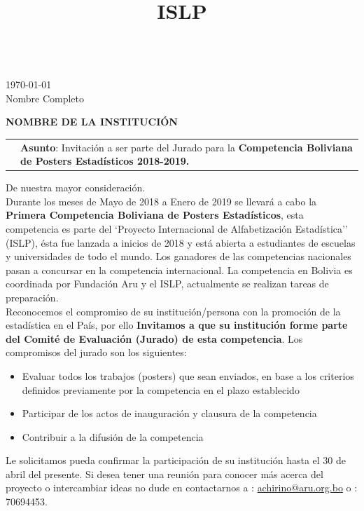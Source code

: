 \documentclass[11pt,a4paper]{article}
\title{ISLP}
\begin{document}
\hfill
\vspace{1.5cm}\\

\hspace{5.5cm} \today \\

Nombre Completo 

\textbf{NOMBRE DE LA INSTITUCIÓN}
\vspace{0.5cm}\\
\begin{tabular}{lp{10cm}}
\hspace{5cm} & \textbf{Asunto}: Invitación a ser parte del Jurado para la \textbf{Competencia Boliviana de Posters Estadísticos 2018-2019.}\\
\end{tabular}

\hfill

De nuestra mayor consideración.\\


Durante los meses de Mayo de 2018 a Enero de 2019 se llevará a cabo la \textbf{Primera Competencia Boliviana de Posters Estadísticos}, esta competencia es parte del `Proyecto Internacional de Alfabetización Estadística'' (ISLP), ésta fue lanzada a inicios de 2018 y está abierta a estudiantes de escuelas y universidades de todo el mundo. Los ganadores de las competencias nacionales pasan a concursar en la competencia internacional. La competencia en Bolivia es coordinada por Fundación Aru y el ISLP, actualmente se realizan tareas de preparación.\\

Reconocemos el compromiso de su institución/persona con la promoción de la estadística en el País, por ello \textbf{Invitamos a que su institución forme parte del Comité de Evaluación (Jurado) de esta competencia}. Los compromisos del jurado son los siguientes:

\begin{itemize}
\item Evaluar todos los trabajos (posters) que sean enviados, en base a los criterios definidos previamente por la competencia en el plazo establecido
\item Participar de los actos de inauguración y clausura de la competencia
\item Contribuir a la difusión de la competencia
\end{itemize}

Le solicitamos pueda confirmar la participación de su institución hasta el 30 de abril del presente. Si desea tener una reunión para conocer más acerca del proyecto o intercambiar ideas no dude en contactarnos a \faEnvelopeO: \url{achirino@aru.org.bo} o  \faPhone: 70694453.\\
\end{document}
